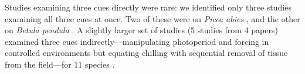\documentclass[11pt,letter]{article}
\begin{document}
Studies examining three cues directly were rare: we identified only three studies examining all three cues at once. Two of these were on \emph{Picea abies} \citep{Worrall:1967aa,Sogaard:2008aa}, and the other on \emph{Betula pendula} \citep{Skuterud:1994aa}. A slightly larger set of studies (5 studies from 4 papers) examined three cues indirectly---manipulating photoperiod and forcing in controlled environments but equating chilling with sequential removal of tissue from the field---for 11 species \citep{Schnabel:1987aa,Heide:1993,Partanen:1998aa,Basler:2014aa}. \\
\end{document}
